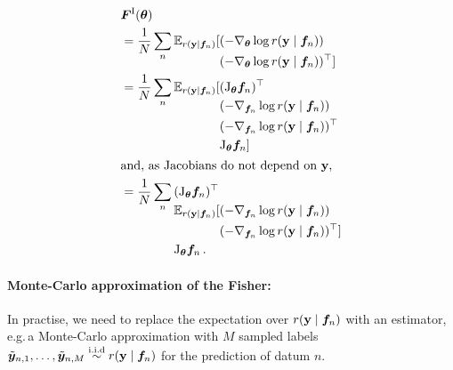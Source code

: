 \begin{align*}
  & \mF^{\text{I}}(\vtheta)
 \\
  & =
 \frac{1}{N} \sum_n
 \E_{r(\rvy \mid \vf_n)}
 [\begin{aligned}[t]
   & (-\nabla_{\vtheta} \log r(\rvy \mid \vf_n)) \\
   & (-\nabla_{\vtheta} \log r(\rvy \mid \vf_n))^{\top}]
 \end{aligned}
 \\
  & =
 \frac{1}{N} \sum_n
 \E_{r(\rvy \mid \vf_n)}
 [\begin{aligned}[t]
   & (\jac_{\vtheta}\vf_n)^{\top} \\
   & (-\nabla_{\vf_n} \log r(\rvy \mid \vf_n)) \\
   & (-\nabla_{\vf_n} \log r(\rvy \mid \vf_n))^{\top} \\
   & \jac_{\vtheta}\vf_n]
 \end{aligned}
 \\
 \shortintertext{and, as Jacobians do not depend on $\rvy$,}
  & =
 \frac{1}{N} \sum_n
 \begin{aligned}[t]
   & (\jac_{\vtheta}\vf_n)^{\top} \\
   & \E_{r(\rvy \mid \vf_n)}
   [(-\nabla_{\vf_n} \log r(\rvy \mid \vf_n)) \\
   & \phantom{\E_{r(\rvy \mid \vf_n)}[}(-\nabla_{\vf_n} \log r(\rvy \mid \vf_n))^{\top}] \\
   & \jac_{\vtheta}\vf_n \,.
 \end{aligned}
\end{align*}

\paragraph{Monte-Carlo approximation of the Fisher:} In practise, we need to replace the expectation over $r({\mathbf{y}} \mid {\bm{f}}_n)$ with an estimator, e.g.\,a Monte-Carlo approximation with $M$ sampled labels $\tilde{{\bm{y}}}_{n,1}, \dots, \tilde{{\bm{y}}}_{n, M} \stackrel{\text{i.i.d}}{\sim} r({\mathbf{y}} \mid {\bm{f}}_n)$ for the prediction of datum $n$.

